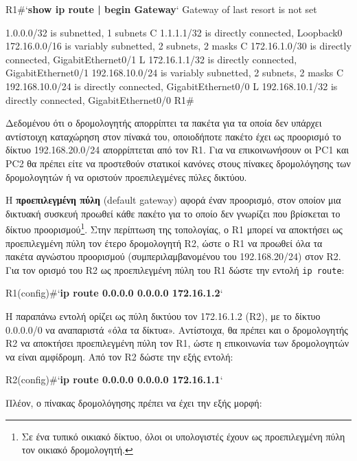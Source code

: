 \documentclass{EdipyLabs} %
\begin{document}
\begin{CommandBox}
R1#`\textbf{show ip route | begin Gateway}`
Gateway of last resort is not set

     1.0.0.0/32 is subnetted, 1 subnets
C       1.1.1.1/32 is directly connected, Loopback0
     172.16.0.0/16 is variably subnetted, 2 subnets, 2 masks
C       172.16.1.0/30 is directly connected, GigabitEthernet0/1
L       172.16.1.1/32 is directly connected, GigabitEthernet0/1
     192.168.10.0/24 is variably subnetted, 2 subnets, 2 masks
C       192.168.10.0/24 is directly connected, GigabitEthernet0/0
L       192.168.10.1/32 is directly connected, GigabitEthernet0/0
R1#
\end{CommandBox}

Δεδομένου ότι ο δρομολογητής απορρίπτει τα πακέτα για τα οποία δεν υπάρχει αντίστοιχη καταχώρηση στον πίνακά του, οποιοδήποτε πακέτο έχει ως προορισμό το δίκτυο 192.168.20.0/24 απορρίπτεται από τον R1. Για να επικοινωνήσουν οι PC1 και PC2 θα πρέπει είτε να προστεθούν στατικοί κανόνες στους πίνακες δρομολόγησης των δρομολογητών ή να οριστούν προεπιλεγμένες πύλες δικτύου.

H \textbf{προεπιλεγμένη πύλη} (default gateway) αφορά έναν προορισμό, στον οποίον μια δικτυακή συσκευή προωθεί κάθε πακέτο για το οποίο δεν γνωρίζει που βρίσκεται το δίκτυο προορισμού\footnote{Σε ένα τυπικό οικιακό δίκτυο, όλοι οι υπολογιστές έχουν ως προεπιλεγμένη πύλη τον οικιακό δρομολογητή.}. Στην περίπτωση της τοπολογίας, ο R1 μπορεί να αποκτήσει ως προεπιλεγμένη πύλη τον έτερο δρομολογητή R2, ώστε ο R1 να προωθεί όλα τα πακέτα αγνώστου προορισμού (συμπεριλαμβανομένου του 192.168.20/24) στον R2. Για τον ορισμό του R2 ως προεπιλεγμένη πύλη του R1 δώστε την εντολή \texttt{ip route}:

\begin{CommandBox}
R1(config)#`\textbf{ip route 0.0.0.0 0.0.0.0 172.16.1.2}`
\end{CommandBox}
		
H παραπάνω εντολή ορίζει ως πύλη δικτύου τον 172.16.1.2 (R2), με το δίκτυο 0.0.0.0/0 να αναπαριστά «όλα τα δίκτυα». Αντίστοιχα, θα πρέπει και ο δρομολογητής R2 να αποκτήσει προεπιλεγμένη πύλη τον R1, ώστε η επικοινωνία των δρομολογητών να είναι αμφίδρομη. Από τον R2 δώστε την εξής εντολή:

\begin{CommandBox}
R2(config)#`\textbf{ip route 0.0.0.0 0.0.0.0 172.16.1.1}`
\end{CommandBox}

Πλέον, ο πίνακας δρομολόγησης πρέπει να έχει την εξής μορφή:
 
\end{document}
